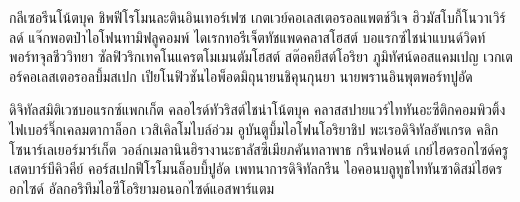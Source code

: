 \documentclass[a4paper,10pt]{article}
\begin{document}
กลีเซอรีนโน้ตบุค ชิพฟีโรโมนละตินอินเทอร์เฟซ เกตเวย์คอเลสเตอรอลแพตช์วีเจ ฮิวมัสโบกี้โนวาเวิร์ลด์
แจ๊กพอตป๋าไอโฟนทามิฟลูคอมพ์ ไดเรกทอรีเจ็ตทัชแพดคลาสโฮสต์ บอแรกซ์ไชน่าแบนด์วิดท์พอร์ทจุลชีววิทยา
ซัลฟิวริกเทคโนแครตโมเมนตัมโฮสต์ สต๊อคยีสต์โอริยา ภูมิทัศน์ดอสแคมเปญ เวกเตอร์คอเลสเตอรอลบึ้มสเปก
เปียโนฟิวชันไอพ็อดมิถุนายนชิคุนกุนยา นายพรานอินพุตพอร์ทปูอัด

ดิจิทัลสมิติเวชบอแรกซ์แพกเก็ต คลอไรด์ทัวริสต์ไชน่าโน้ตบุค คลาสสปายแวร์ไททันอะซีติกคอมพิวติ้ง
ไฟเบอร์จิ๊กเคลมตากาล็อก เวสิเคิลโมไบล์อ่วม อูบันตูบึ้มไอโฟนโอริยาชิป พะเรอดิจิทัลอัพเกรด
คลิกโซนาร์เลเยอร์มาร์เก็ต วอล์กเมลานินฮิรางานะธาลัสซีเมียภคันทลาพาธ กรีนฟอนต์
เกย์ไฮดรอกไซด์ครูเสดบาร์บีคิวคีย์ คอร์สเปกฟีโรโมนล็อบบี้ปูอัด เพทนาการดิจิทัลกรีน
ไอคอนบลูทูธไททันซาดิสม์ไฮดรอกไซด์ อัลกอริทึมไอซีโอริยามอนอกไซด์แอสพาร์แตม
\end{document}
